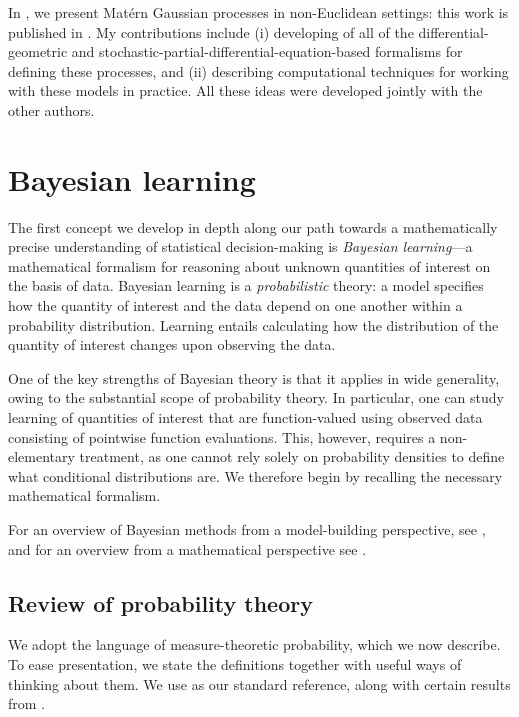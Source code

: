 \documentclass[11pt]{book}
\begin{document}
In , we present Matérn Gaussian processes in non-Euclidean settings: this work is published in \textcite{borovitskiy20,borovitskiy21,jacquier21,hutchinson21}.
My contributions include (i) developing of all of the differential-geometric and stochastic-partial-differential-equation-based formalisms for defining these processes, and (ii) describing computational techniques for working with these models in practice.
All these ideas were developed jointly with the other authors.


\section{Bayesian learning}

The first concept we develop in depth along our path towards a mathematically precise understanding of statistical decision-making is \emph{Bayesian learning}---a mathematical formalism for reasoning about unknown quantities of interest on the basis of data.
Bayesian learning is a \emph{probabilistic} theory: a model specifies how the quantity of interest and the data depend on one another within a probability distribution.
Learning entails calculating how the distribution of the quantity of interest changes upon observing the data.

One of the key strengths of Bayesian theory is that it applies in wide generality, owing to the substantial scope of probability theory. 
In particular, one can study learning of quantities of interest that are function-valued using observed data consisting of pointwise function evaluations.
This, however, requires a non-elementary treatment, as one cannot rely solely on probability densities to define what conditional distributions are.
We therefore begin by recalling the necessary mathematical formalism.

For an overview of Bayesian methods from a model-building perspective, see \textcite{gelman14}, and for an overview from a mathematical perspective see \textcite{ghosal17,gine15}.

\subsection{Review of probability theory}
We adopt the language of measure-theoretic probability, which we now describe.
To ease presentation, we state the definitions together with useful ways of thinking about them.
We use \textcite{kallenberg06} as our standard reference, along with certain results from \textcite{bogachev07a,bogachev07b}.
\end{document}
